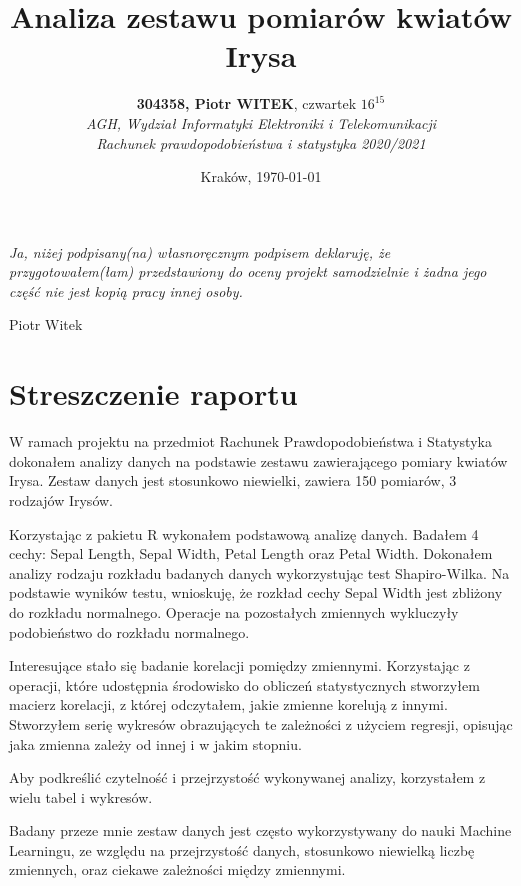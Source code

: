 \documentclass{article}
\title{Analiza zestawu pomiarów kwiatów Irysa}
\author{\textbf{304358, Piotr WITEK}, czwartek $16^{15}$\\ 
\textit{AGH, Wydział Informatyki Elektroniki i Telekomunikacji}\\
\textit{Rachunek prawdopodobieństwa i statystyka 2020/2021}}
\date{Kraków, \today}
\begin{document}

\maketitle

\textit{Ja, niżej podpisany(na) własnoręcznym podpisem deklaruję, że przygotowałem(łam) przedstawiony do oceny projekt samodzielnie i żadna jego część nie jest kopią pracy innej osoby.}
\begin{flushright}
{Piotr Witek}
\end{flushright}

\section{Streszczenie raportu}

 \qquad W ramach projektu na przedmiot Rachunek Prawdopodobieństwa i Statystyka dokonałem analizy danych na podstawie zestawu zawierającego pomiary kwiatów Irysa. Zestaw danych jest stosunkowo niewielki, zawiera 150 pomiarów, 3 rodzajów Irysów.

\vspace{0.2cm}

Korzystając z pakietu R wykonałem podstawową analizę danych. Badałem 4 cechy: Sepal Length, Sepal Width, Petal Length oraz Petal Width. Dokonałem analizy rodzaju rozkładu badanych danych wykorzystując test Shapiro-Wilka. Na podstawie wyników testu, wnioskuję, że rozkład cechy Sepal Width jest zbliżony do rozkładu normalnego. Operacje na pozostałych zmiennych wykluczyły podobieństwo do rozkładu normalnego.

\vspace{0.2cm}

Interesujące stało się badanie korelacji pomiędzy zmiennymi. Korzystając z operacji, które udostępnia środowisko do obliczeń statystycznych stworzyłem macierz korelacji, z której odczytałem, jakie zmienne korelują z innymi. Stworzyłem serię wykresów obrazujących te zależności z użyciem regresji, opisując jaka zmienna zależy od innej i w jakim stopniu.

\vspace{0.2cm}

Aby podkreślić czytelność i przejrzystość wykonywanej analizy, korzystałem z wielu tabel i wykresów.

\vspace{0.2cm}

Badany przeze mnie zestaw danych jest często wykorzystywany do nauki Machine Learningu, ze względu na przejrzystość danych, stosunkowo niewielką liczbę zmiennych, oraz ciekawe zależności między zmiennymi.
\end{document}
